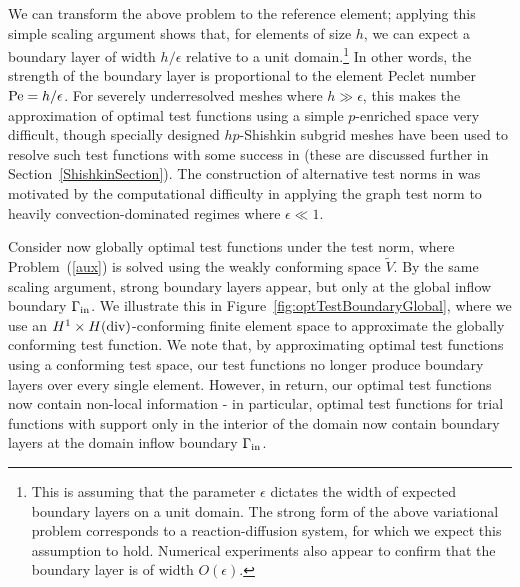 \documentclass[11pt,onecolumn]{scrartcl}
\begin{document}
We can transform the above problem to the reference element; applying this simple scaling argument shows that, for elements of size $h$, we can expect a boundary layer of width $h/\epsilon$ relative to a unit domain.\footnote{This is assuming that the parameter $\epsilon$ dictates the width of expected boundary layers on a unit domain. The strong form of the above variational problem corresponds to a reaction-diffusion system, for which we expect this assumption to hold.  Numerical experiments also appear to confirm that the boundary layer is of width $O(\epsilon)$.}  In other words, the strength of the boundary layer is proportional to the element Peclet number ${\rm Pe} = h/\epsilon$.  For severely underresolved meshes where $h \gg \epsilon$, this makes the approximation of optimal test functions using a simple $p$-enriched space very difficult, though specially designed $hp$-Shishkin subgrid meshes have been used to resolve such test functions with some success in \cite{DBLP:journals/procedia/NiemiCC11} (these are discussed further in Section~\ref{ShishkinSection}).  The construction of alternative test norms in \cite{DPGrobustness, ChanHeuerBui-ThanhDemkowicz12} was motivated by the computational difficulty in applying the graph test norm to heavily convection-dominated regimes where $\epsilon \ll 1$.  

Consider now globally optimal test functions under the test norm, where Problem~(\ref{aux}) is solved using the weakly conforming space $\tilde{V}$.  By the same scaling argument, strong boundary layers appear, but only at the global inflow boundary $\Gamma_{\rm in}$.  We illustrate this in Figure~\ref{fig:optTestBoundaryGlobal}, where we use an $H^1\times H({\rm div})$-conforming finite element space to approximate the globally conforming test function.  We note that, by approximating optimal test functions using a conforming test space, our test functions no longer produce boundary layers over every single element. However, in return, our optimal test functions now contain non-local information - in particular, optimal test functions for trial functions with support only in the interior of the domain now contain boundary layers at the domain inflow boundary $\Gamma_{\rm in}$.
\end{document}
